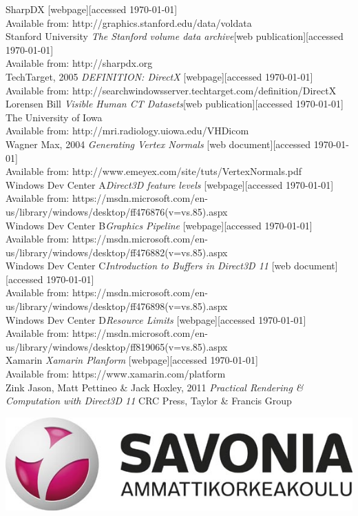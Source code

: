 \documentclass[twoside, english, 11pt]{report}
\begin{document}
\small SharpDX [webpage][accessed \today] \\
Available from: http://graphics.stanford.edu/data/voldata\\

\small Stanford University \textit{The Stanford volume data archive}[web publication][accessed \today] \\
Available from: http://sharpdx.org\\

\small TechTarget, 2005 \textit{DEFINITION: DirectX} [webpage][accessed \today] \\
Available from: http://searchwindowsserver.techtarget.com/definition/DirectX\\

\small Lorensen Bill \textit{Visible Human CT Datasets}[web publication][accessed \today] The University of Iowa  \\
Available from: http://mri.radiology.uiowa.edu/VHDicom\\

\small Wagner Max, 2004 \textit{Generating Vertex Normals} [web document][accessed \today] \\
Available from: http://www.emeyex.com/site/tuts/VertexNormals.pdf\\

\small Windows Dev Center A\textit{Direct3D feature levels} [webpage][accessed \today] \\
Available from: https://msdn.microsoft.com/en-us/library/windows/desktop/ff476876(v=vs.85).aspx\\

\small Windows Dev Center B\textit{Graphics Pipeline} [webpage][accessed \today] \\
Available from: https://msdn.microsoft.com/en-us/library/windows/desktop/ff476882(v=vs.85).aspx\\

\small Windows Dev Center C\textit{Introduction to Buffers in Direct3D 11} [web document][accessed \today] \\
Available from: https://msdn.microsoft.com/en-us/library/windows/desktop/ff476898(v=vs.85).aspx\\

\small Windows Dev Center D\textit{Resource Limits } [webpage][accessed \today] \\
Available from: https://msdn.microsoft.com/en-us/library/windows/desktop/ff819065(v=vs.85).aspx\\

\small Xamarin \textit{Xamarin Planform} [webpage][accessed \today] \\
Available from: https://www.xamarin.com/platform\\

\small Zink Jason, Matt Pettineo \& Jack Hoxley, 2011 \textit{Practical Rendering \& Computation with Direct3D 11} CRC Press, Taylor \& Francis Group \\

\newpage

\thispagestyle{empty}
\vspace{4in}
\centerline{\includegraphics{savonia.jpg}}
\end{document}
